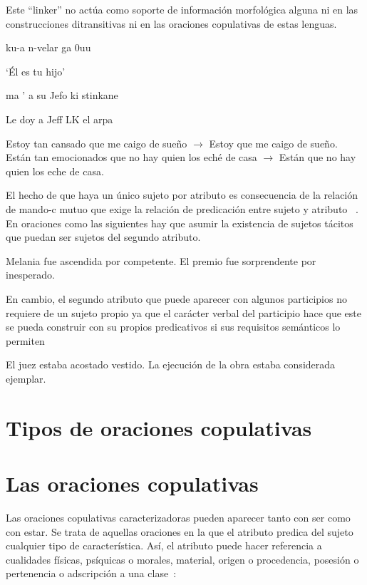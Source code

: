 Este \enquote{linker} no actúa como soporte de información morfológica alguna ni en las construcciones ditransitivas ni en las oraciones copulativas de estas lenguas.

ku-a n-velar ga 0uu

‘Él es tu hijo’

ma ' a su Jefo ki stinkane

Le doy a Jeff LK el arpa

\pex[*]
\a	Estoy tan cansado que me caigo de sueño $\longrightarrow$  Estoy que me caigo de sueño.
\a	Están tan emocionados que no hay quien los eché de casa $\longrightarrow$  Están que no hay quien los eche de casa.
\xe


El hecho de que haya un único sujeto por atributo es consecuencia de la relación de mando-c mutuo que exige la relación de predicación entre sujeto y atributo ~\autocite{Williams1980Predication,Bowers1993The-Syntax-of-Predic}. En oraciones como las siguientes hay que asumir la existencia de sujetos tácitos que puedan ser sujetos del segundo atributo.

\pex[*]
\a Melania fue ascendida por competente.
\a El premio fue sorprendente por inesperado.
\xe


En cambio, el segundo atributo que puede aparecer con algunos participios no requiere de un sujeto propio ya que el carácter verbal del participio hace que este se pueda construir con su propios predicativos si sus requisitos semánticos lo permiten~\autocite{Bosque1999el-sintagma-adjetiva}

\pex[*]
\a	El juez estaba acostado vestido.
\a	La ejecución de la obra estaba considerada ejemplar.
\xe

\section{Tipos de oraciones copulativas}


\section{Las oraciones copulativas}

Las oraciones copulativas caracterizadoras pueden aparecer tanto con ser como con estar. Se trata de aquellas oraciones en la que el atributo predica del sujeto cualquier tipo de característica. Así, el atributo puede hacer referencia a cualidades físicas, psíquicas o morales, material, origen o procedencia, posesión o pertenencia o adscripción a una clase~\parencites[][]{Leborans1999Predicacion}[][]{Bentley20179Copular-and-}:

